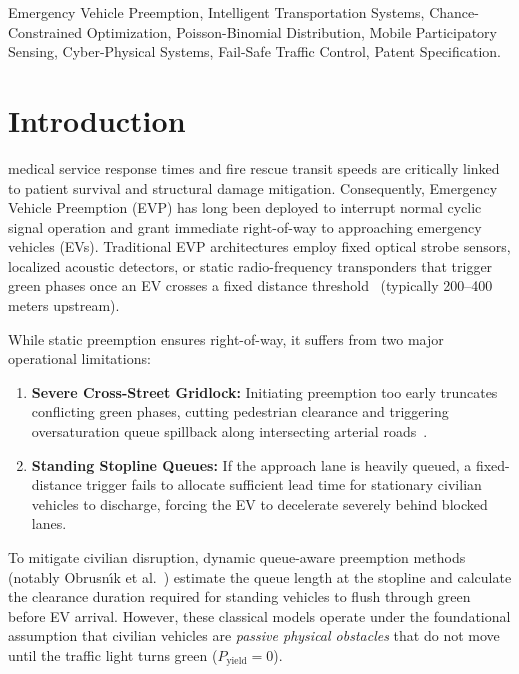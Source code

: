 \documentclass[journal,10pt,twocolumn]{IEEEtran}
\begin{document}
\begin{IEEEkeywords}
Emergency Vehicle Preemption, Intelligent Transportation Systems, Chance-Constrained Optimization, Poisson-Binomial Distribution, Mobile Participatory Sensing, Cyber-Physical Systems, Fail-Safe Traffic Control, Patent Specification.
\end{IEEEkeywords}

\section{Introduction}
 medical service response times and fire rescue transit speeds are critically linked to patient survival and structural damage mitigation. Consequently, Emergency Vehicle Preemption (EVP) has long been deployed to interrupt normal cyclic signal operation and grant immediate right-of-way to approaching emergency vehicles (EVs). Traditional EVP architectures employ fixed optical strobe sensors, localized acoustic detectors, or static radio-frequency transponders that trigger green phases once an EV crosses a fixed distance threshold~\cite{skabardonis2000,mirchandani2001,dion2005} (typically 200--400\,meters upstream).

While static preemption ensures right-of-way, it suffers from two major operational limitations:
\begin{enumerate}
    \item \textbf{Severe Cross-Street Gridlock:} Initiating preemption too early truncates conflicting green phases, cutting pedestrian clearance and triggering oversaturation queue spillback along intersecting arterial roads~\cite{qin2012evp,bie2020evp,kang2021preempt}.
    \item \textbf{Standing Stopline Queues:} If the approach lane is heavily queued, a fixed-distance trigger fails to allocate sufficient lead time for stationary civilian vehicles to discharge, forcing the EV to decelerate severely behind blocked lanes.
\end{enumerate}

To mitigate civilian disruption, dynamic queue-aware preemption methods (notably Obrusn\'{\i}k et al.~\cite{obrusnik2020}) estimate the queue length at the stopline and calculate the clearance duration required for standing vehicles to flush through green before EV arrival. However, these classical models operate under the foundational assumption that civilian vehicles are \emph{passive physical obstacles} that do not move until the traffic light turns green ($P_{\text{yield}} = 0$).
\end{document}
